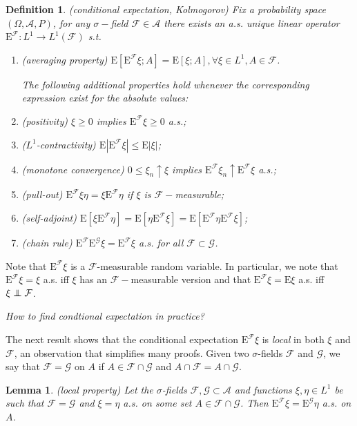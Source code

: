\documentclass[12pt,a4paper]{article}
\newcommand{\E}{\mathop{\mathbb{E}}}
\def \E{\mbox{E}}
\def \A {\mathcal{A}}
\def \G {\mathcal{G}}
\def \F {\mathcal{F}}
\newtheorem{lemma}[theorem]{Lemma}
\newtheorem{definition}[theorem]{Definition}
\newcommand\independent{\protect\mathpalette{\protect\independenT}{\perp}}
\def\independenT#1#2{\mathrel{\rlap{$#1#2$}\mkern2mu{#1#2}}}
\begin{document}
\begin{definition}
  (conditional expectation, Kolmogorov) Fix a probability space $(\Omega,\A,P)$, for any $\sigma-$field $\F\in\A$ there exists an a.s. unique linear operator $\E^{\F}: L^1\to L^1(\F)$ s.t.
  \begin{enumerate}
    \item (averaging property) $\E\left[ \E^{\F}\xi; A \right] = \E\left[ \xi;A \right],\forall \xi\in L^1, A\in\F$. 

      The following additional properties hold whenever the corresponding expression exist for the absolute values:

    \item (positivity) $\xi\ge 0 $ implies $\E^{\F}\xi\ge 0$ a.s.;
    \item ($L^1$-contractivity) $\E|\E^{\F}\xi|\le \E|\xi|$;
    \item (monotone convergence) $0\le \xi_n \uparrow \xi$ implies $\E^{\F}\xi_n \uparrow \E^{\F}\xi$ a.s.;
    \item (pull-out) $\E^{\F}\xi\eta = \xi \E^{\F}\eta$ if $\xi$ is $\F- $measurable;
    \item (self-adjoint) $\E\left[ \xi \E^{\F}\eta \right]=\E\left[ \eta \E^{\F}\xi \right]=\E\left[  \E^{\F}\eta \E^{\F}\xi \right]$;
    \item (chain rule) $\E^{\F}\E^{\G}\xi = \E^{\F}\xi$ a.s. for all $\F\subset \G$.  
  \end{enumerate}
\end{definition}

Note that $\E^{\F}\xi$ is a $\F$-measurable random variable. 
In particular, we note that $\E^{\F}\xi = \xi$ a.s. iff $\xi$ has an $\F-$measurable version and that $\E^{\F}\xi = \E\xi$ a.s. iff $\xi\independent \F$.

{\em How to find condtional expectation in practice?} 

The next result shows that the conditional expectation $\E^{\F}\xi$ is {\em local} in both $\xi$ and $\F$, an observation that simplifies many proofs. Given two $\sigma$-fields $\F$ and $\G$, we say that $\F=\G$ on $A$ if $A\in\F\cap\G$ and $A\cap\F = A\cap\G$.
\begin{lemma}
  (local property) Let the $\sigma$-fields $\F,\G\subset\A$ and functions $\xi,\eta\in L^1$ be such that $\F=\G$ and $\xi=\eta$ a.s. on some set $A\in\F\cap\G$. Then $\E^{\F}\xi = \E^{\G}\eta$ a.s. on $A$. 
  \label{lem:ce_local_property}
\end{lemma}
\end{document}
